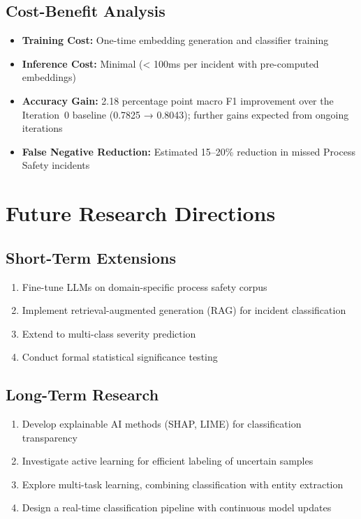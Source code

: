 \documentclass[11pt, titlepage, bibliography=totoc]{scrreprt}
\begin{document}
\subsection{Cost-Benefit Analysis}
\begin{itemize}
    \item \textbf{Training Cost:} One-time embedding generation and classifier training
    \item \textbf{Inference Cost:} Minimal (< 100ms per incident with pre-computed embeddings)
    \item \textbf{Accuracy Gain:} 2.18 percentage point macro F1 improvement over the Iteration~0 baseline (0.7825 → 0.8043); further gains expected from ongoing iterations
    \item \textbf{False Negative Reduction:} Estimated 15--20\% reduction in missed Process Safety incidents
\end{itemize}

\section{Future Research Directions}

\subsection{Short-Term Extensions}
\begin{enumerate}
    \item Fine-tune LLMs on domain-specific process safety corpus
    \item Implement retrieval-augmented generation (RAG) for incident classification
    \item Extend to multi-class severity prediction
    \item Conduct formal statistical significance testing
\end{enumerate}

\subsection{Long-Term Research}
\begin{enumerate}
    \item Develop explainable AI methods (SHAP, LIME) for classification transparency
    \item Investigate active learning for efficient labeling of uncertain samples
    \item Explore multi-task learning, combining classification with entity extraction
    \item Design a real-time classification pipeline with continuous model updates
\end{enumerate}
\end{document}
